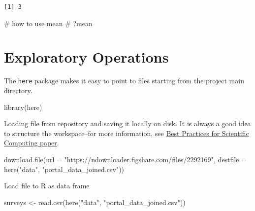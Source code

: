 \documentclass[
  letterpaper,
  DIV=11,
  numbers=noendperiod]{scrreprt}
\newenvironment{Shaded}{\begin{snugshade}}{\end{snugshade}}
\newcommand{\AttributeTok}[1]{\textcolor[rgb]{0.40,0.45,0.13}{#1}}
\newcommand{\CommentTok}[1]{\textcolor[rgb]{0.37,0.37,0.37}{#1}}
\newcommand{\FunctionTok}[1]{\textcolor[rgb]{0.28,0.35,0.67}{#1}}
\newcommand{\NormalTok}[1]{\textcolor[rgb]{0.00,0.23,0.31}{#1}}
\newcommand{\OtherTok}[1]{\textcolor[rgb]{0.00,0.23,0.31}{#1}}
\newcommand{\StringTok}[1]{\textcolor[rgb]{0.13,0.47,0.30}{#1}}
\begin{document}
\begin{verbatim}
[1] 3
\end{verbatim}

\begin{Shaded}
\begin{Highlighting}[]
\CommentTok{\# how to use mean}
\CommentTok{\# ?mean}
\end{Highlighting}
\end{Shaded}

\section{Exploratory Operations}\label{exploratory-operations}

The \texttt{here} package makes it easy to point to files starting from
the project main directory.

\begin{Shaded}
\begin{Highlighting}[]
\FunctionTok{library}\NormalTok{(here)}
\end{Highlighting}
\end{Shaded}

Loading file from repository and saving it locally on disk. It is always
a good idea to structure the workspace--for more information, see
\href{http://journals.plos.org/plosbiology/article?id=10.1371/journal.pbio.1001745}{Best
Practices for Scientific Computing paper}.

\begin{Shaded}
\begin{Highlighting}[]
\FunctionTok{download.file}\NormalTok{(}\AttributeTok{url =} \StringTok{"https://ndownloader.figshare.com/files/2292169"}\NormalTok{, }
    \AttributeTok{destfile =} \FunctionTok{here}\NormalTok{(}\StringTok{"data"}\NormalTok{, }\StringTok{"portal\_data\_joined.csv"}\NormalTok{))}
\end{Highlighting}
\end{Shaded}

Load file to R as data frame

\begin{Shaded}
\begin{Highlighting}[]
\NormalTok{surveys }\OtherTok{\textless{}{-}} \FunctionTok{read.csv}\NormalTok{(}\FunctionTok{here}\NormalTok{(}\StringTok{"data"}\NormalTok{, }\StringTok{"portal\_data\_joined.csv"}\NormalTok{))}
\end{Highlighting}
\end{Shaded}
\end{document}
